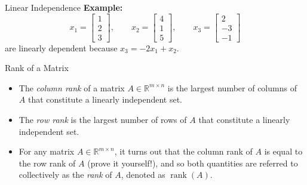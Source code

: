 \documentclass[aspectratio=169,12pt]{beamer}
\DeclareMathOperator{\rank}{rank}
\begin{document}
\begin{frame}[t]{Linear Independence}
  \vspace{0.88cm}
  {\large
  \textbf{Example:}
  \[
    x_1=\begin{bmatrix}1\\2\\3\end{bmatrix},\qquad
    x_2=\begin{bmatrix}4\\1\\5\end{bmatrix},\qquad
    x_3=\begin{bmatrix}2\\-3\\-1\end{bmatrix}
  \]
  are linearly dependent because $x_3=-2x_1+x_2$.
  }
\end{frame}

\begin{frame}[t]{Rank of a Matrix}
  \vspace{0.12cm}
  {\small
  \begin{itemize}
    \setlength{\itemsep}{0.32cm}
    \item The \emph{column rank} of a matrix $A\in\mathbb{R}^{m\times n}$ is the
          largest number of columns of $A$ that constitute a linearly independent set.
    \item The \emph{row rank} is the largest number of rows of $A$ that constitute a
          linearly independent set.
    \item For any matrix $A\in\mathbb{R}^{m\times n}$, it turns out that the column
          rank of $A$ is equal to the row rank of $A$ (prove it yourself!), and so both
          quantities are referred to collectively as the \emph{rank} of $A$, denoted
          as $\rank(A)$.
  \end{itemize}
  }
\end{frame}
\end{document}
